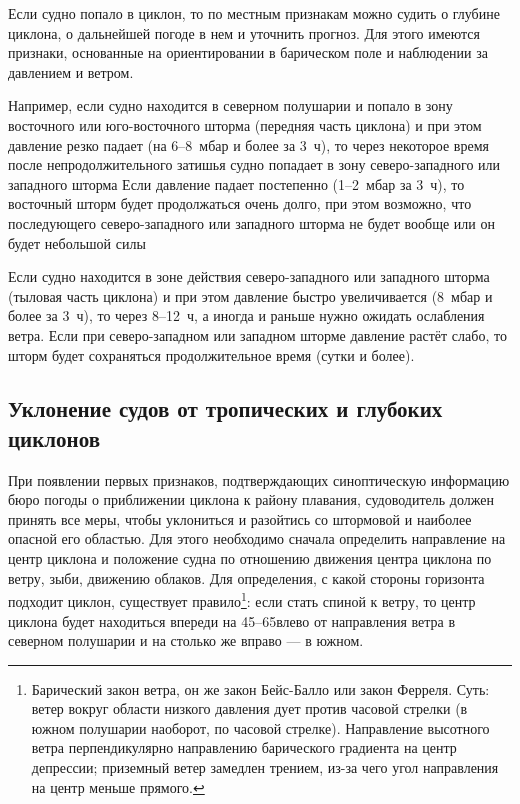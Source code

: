 Если судно попало в циклон, то по местным признакам можно судить о
глубине циклона, о дальнейшей погоде в нем и уточнить прогноз. Для
этого имеются признаки, основанные на ориентировании в барическом поле
и наблюдении за давлением и ветром.

Например, если судно находится в северном полушарии и попало в зону
восточного или юго-восточного шторма (передняя часть циклона) и при
этом давление резко падает (на 6--8~мбар и более за 3~ч), то через
некоторое время после непродолжительного затишья судно попадает в зону
северо-западного или западного шторма Если давление падает постепенно
(1--2~мбар за 3~ч), то восточный шторм будет продолжаться очень долго,
при этом возможно, что последующего северо-западного или западного
шторма не будет вообще или он будет небольшой силы

Если судно находится в зоне действия северо-западного или западного
шторма (тыловая часть циклона) и при этом давление быстро
увеличивается (8~мбар и более за 3~ч), то через 8--12~ч, а иногда и
раньше нужно ожидать ослабления ветра. Если при северо-западном или
западном шторме давление растёт слабо, то шторм будет сохраняться
продолжительное время (сутки и более).

\subsection{Уклонение судов от тропических и глубоких циклонов}
\label{sec:evasion_from_cyclones}

При появлении первых признаков, подтверждающих синоптическую
информацию бюро погоды о приближении циклона к району плавания,
судоводитель должен принять все меры, чтобы уклониться и разойтись со
штормовой и наиболее опасной его областью. Для этого необходимо
сначала определить направление на центр циклона и положение судна по
отношению движения центра циклона по ветру, зыби, движению
облаков. Для определения, с какой стороны горизонта подходит циклон,
существует правило\footnote{Барический закон ветра, он же закон
  Бейс-Балло или закон Ферреля. Суть: ветер вокруг области низкого
  давления дует против часовой стрелки (в южном полушарии наоборот, по
  часовой стрелке). Направление высотного ветра перпендикулярно
  направлению барического градиента на центр депрессии; приземный
  ветер замедлен трением, из-за чего угол направления на центр меньше
  прямого.}: если
стать спиной к ветру, то центр циклона будет находиться впереди на
45--65\gr влево от направления ветра в северном полушарии и на столько
же вправо — в южном.

